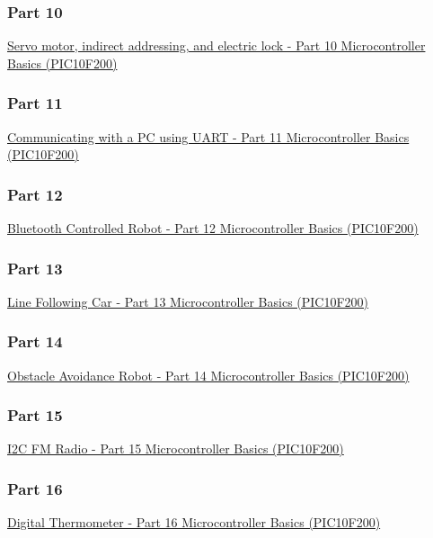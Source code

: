 \documentclass[12pt, letterpaper]{article}
\begin{document}
\subsubsection{Part 10}
\href{https://www.circuitbread.com/tutorials/servo-motor-indirect-addressing-and-electronic-lock---part-10-microcontroller-basics-pic10f200}{Servo motor, indirect addressing, and electric lock - Part 10 Microcontroller Basics (PIC10F200)}\\
\subsubsection{Part 11}
\href{https://www.circuitbread.com/tutorials/communicating-with-a-pc-using-uart---part-11-microcontroller-basics-pic10f200}{Communicating with a PC using UART - Part 11 Microcontroller Basics (PIC10F200)}\\
\subsubsection{Part 12}
\href{https://www.circuitbread.com/tutorials/bluetooth-controlled-robot?token=w_zWrzkxdM0H4BuRq-v0tg9uQv_kKaYI}{Bluetooth Controlled Robot - Part 12 Microcontroller Basics (PIC10F200)}\\
\subsubsection{Part 13}
\href{https://www.circuitbread.com/tutorials/line-following-car-part-13-microcontroller-basics-pic10f200}{Line Following Car - Part 13 Microcontroller Basics (PIC10F200)}\\
\subsubsection{Part 14}
\href{https://www.circuitbread.com/tutorials/obstacle-avoidance-robot-part-14-microcontroller-basics-pic10f200}{Obstacle Avoidance Robot - Part 14 Microcontroller Basics (PIC10F200)}\\
\subsubsection{Part 15}
\href{https://www.circuitbread.com/tutorials/i2c-fm-radio-part-15-microcontroller-basics-pic10f200}{I2C FM Radio - Part 15 Microcontroller Basics (PIC10F200)}\\
\subsubsection{Part 16}
\href{https://www.circuitbread.com/tutorials/digital-thermometer-part-16-microcontroller-basics-pic10f200}{Digital Thermometer - Part 16 Microcontroller Basics (PIC10F200)}\\
\end{document}
